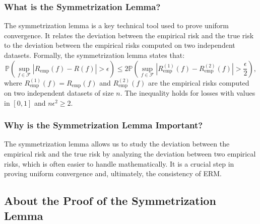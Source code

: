 \begin{notechapter}
\subsubsection{What is the Symmetrization Lemma?}
The symmetrization lemma is a key technical tool used to prove uniform convergence. It relates the deviation between the empirical risk and the true risk to the deviation between the empirical risks computed on two independent datasets. Formally, the symmetrization lemma states that:
\[
\mathbb{P}\left( \sup_{f \in \mathcal{F}} |R_{\text{emp}}(f) - R(f)| > \epsilon \right) \leq 2 \mathbb{P}\left( \sup_{f \in \mathcal{F}} |R_{\text{emp}}^{(1)}(f) - R_{\text{emp}}^{(2)}(f)| > \frac{\epsilon}{2} \right),
\]
where \( R_{\text{emp}}^{(1)}(f) = R_{\text{emp}}(f) \) and \( R_{\text{emp}}^{(2)}(f) \) are the empirical risks computed on two independent datasets of size \( n \). The inequality holds for losses with values in \( [0,1] \) and \( n\epsilon^2 \geq 2 \).

\subsubsection{Why is the Symmetrization Lemma Important?}
The symmetrization lemma allows us to study the deviation between the empirical risk and the true risk by analyzing the deviation between two empirical risks, which is often easier to handle mathematically. It is a crucial step in proving uniform convergence and, ultimately, the consistency of ERM.

\subsection{About the Proof of the Symmetrization Lemma}


\end{notechapter}
